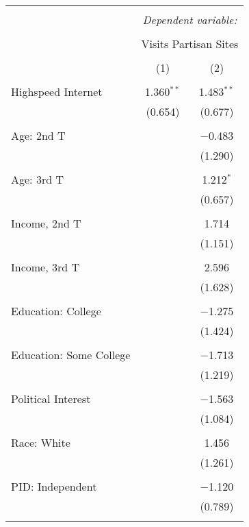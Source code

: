 
\begin{tabular}{@{\extracolsep{5pt}}lcc} 
\\[-1.8ex]\hline 
\hline \\[-1.8ex] 
 & \multicolumn{2}{c}{\textit{Dependent variable:}} \\ 
\cline{2-3} 
\\[-1.8ex] & \multicolumn{2}{c}{Visits Partisan Sites} \\ 
\\[-1.8ex] & (1) & (2)\\ 
\hline \\[-1.8ex] 
 Highspeed Internet & 1.360$^{**}$ & 1.483$^{**}$ \\ 
  & (0.654) & (0.677) \\ 
  & & \\ 
 Age: 2nd T &  & $-$0.483 \\ 
  &  & (1.290) \\ 
  & & \\ 
 Age: 3rd T &  & 1.212$^{*}$ \\ 
  &  & (0.657) \\ 
  & & \\ 
 Income, 2nd T &  & 1.714 \\ 
  &  & (1.151) \\ 
  & & \\ 
 Income, 3rd T &  & 2.596 \\ 
  &  & (1.628) \\ 
  & & \\ 
 Education: College &  & $-$1.275 \\ 
  &  & (1.424) \\ 
  & & \\ 
 Education: Some College &  & $-$1.713 \\ 
  &  & (1.219) \\ 
  & & \\ 
 Political Interest &  & $-$1.563 \\ 
  &  & (1.084) \\ 
  & & \\ 
 Race: White &  & 1.456 \\ 
  &  & (1.261) \\ 
  & & \\ 
 PID: Independent &  & $-$1.120 \\ 
  &  & (0.789) \\ 
  & & \\ 

\end{tabular}
